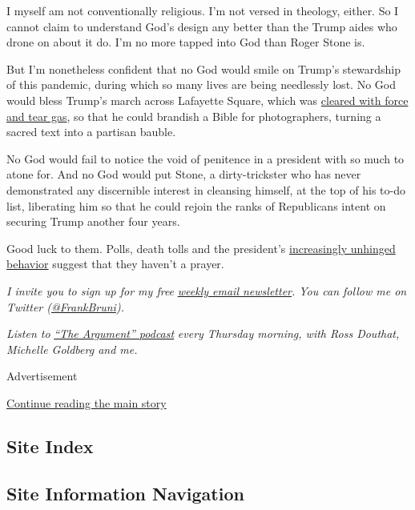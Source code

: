 I myself am not conventionally religious. I'm not versed in theology,
either. So I cannot claim to understand God's design any better than the
Trump aides who drone on about it do. I'm no more tapped into God than
Roger Stone is.

But I'm nonetheless confident that no God would smile on Trump's
stewardship of this pandemic, during which so many lives are being
needlessly lost. No God would bless Trump's march across Lafayette
Square, which was
\href{https://www.nytimes3xbfgragh.onion/2020/06/01/us/politics/trump-st-johns-church-bible.html}{cleared
with force and tear gas}, so that he could brandish a Bible for
photographers, turning a sacred text into a partisan bauble.

No God would fail to notice the void of penitence in a president with so
much to atone for. And no God would put Stone, a dirty-trickster who has
never demonstrated any discernible interest in cleansing himself, at the
top of his to-do list, liberating him so that he could rejoin the ranks
of Republicans intent on securing Trump another four years.

Good luck to them. Polls, death tolls and the president's
\href{https://www.nytimes3xbfgragh.onion/2020/07/14/us/politics/trump-news-conference.html}{increasingly
unhinged behavior} suggest that they haven't a prayer.

\emph{I invite you to sign up for my free}
\href{https://www.nytimes3xbfgragh.onion/newsletters/frank-bruni}{\emph{weekly
email newsletter}}\emph{. You can follow me on Twitter
(}\href{https://twitter.com/FrankBruni}{\emph{@FrankBruni}}\emph{).}

\emph{Listen to}
\href{https://www.nytimes3xbfgragh.onion/column/the-argument}{\emph{``The
Argument'' podcast}} \emph{every Thursday morning, with Ross Douthat,
Michelle Goldberg and me.}

Advertisement

\protect\hyperlink{after-bottom}{Continue reading the main story}

\hypertarget{site-index}{%
\subsection{Site Index}\label{site-index}}

\hypertarget{site-information-navigation}{%
\subsection{Site Information
Navigation}\label{site-information-navigation}}

